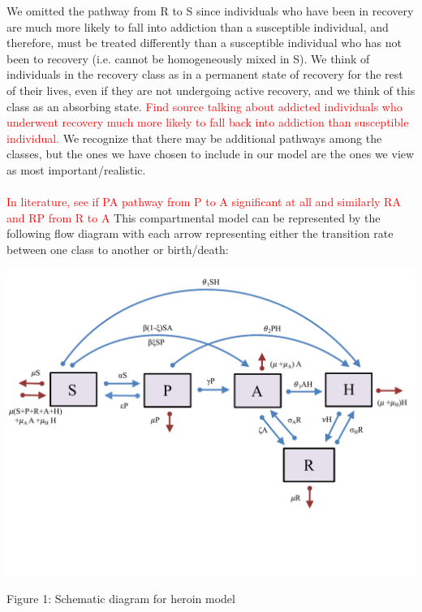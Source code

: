\documentclass[12pt]{article}
\begin{document}
We omitted the pathway from R to S since individuals who have been in recovery are much more likely to fall into addiction than a susceptible individual, and therefore, must be treated differently than a susceptible individual who has not been to recovery (i.e. cannot be homogeneously mixed in S). We think of individuals in the recovery class as in a permanent state of recovery for the rest of their lives, even if they are not undergoing active recovery, and we think of this class as an absorbing state. \textcolor{red}{Find source talking about addicted individuals who underwent recovery much more likely to fall back into addiction than susceptible individual.} We recognize that there may be additional pathways among the classes, but the ones we have chosen to include in our model are the ones we view as most important/realistic. \\ \\
\textcolor{red}{In literature, see if PA pathway from P to A significant at all and similarly RA and RP from R to A} 
This compartmental model can be represented by the following flow diagram with each arrow representing either the transition rate between one class to another or birth/death: 

\includegraphics[scale=0.6]{heroin_schematic.pdf}
\vspace{-0.5cm}
\begin{center}
Figure 1: Schematic diagram for heroin model
\end{center}

\end{document}
